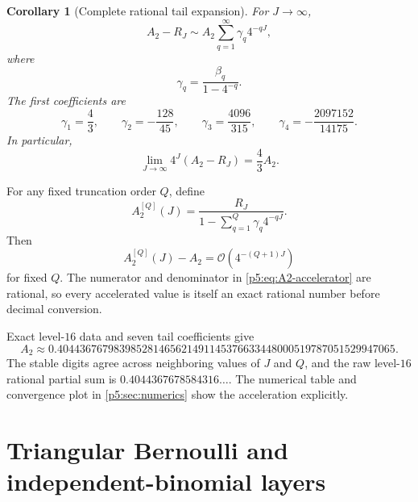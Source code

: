 \documentclass[11pt,oneside]{article}
\newtheorem{corollary}[theorem]{Corollary}
\theoremstyle{definition}
\newcommand{\bigO}{\mathcal O}
\begin{document}
\begin{corollary}[Complete rational tail expansion]
\label{p5:cor:A2-tail-asymptotic}
For $J\to\infty$,
\begin{equation}
 A_2-R_J\sim A_2\sum_{q=1}^\infty\gamma_q4^{-qJ},        \label{p5:eq:A2-tail-asymptotic}
\end{equation}
where
\begin{equation}
 \gamma_q=\frac{\beta_q}{1-4^{-q}}.                     \label{p5:eq:gamma-definition}
\end{equation}
The first coefficients are
\begin{equation}
 \gamma_1=\frac43,
 \qquad
 \gamma_2=-\frac{128}{45},
 \qquad
 \gamma_3=\frac{4096}{315},
 \qquad
 \gamma_4=-\frac{2097152}{14175}.                       \label{p5:eq:gamma-first}
\end{equation}
In particular,
\begin{equation}
 \boxed{\displaystyle
 \lim_{J\to\infty}4^J(A_2-R_J)=\frac43A_2.}             \label{p5:eq:A2-tail-leading}
\end{equation}
\end{corollary}

For any fixed truncation order $Q$, define
\begin{equation}
 A_2^{[Q]}(J)=
 \frac{R_J}{1-\sum_{q=1}^{Q}\gamma_q4^{-qJ}}.            \label{p5:eq:A2-accelerator}
\end{equation}
Then
\begin{equation}
 A_2^{[Q]}(J)-A_2=\bigO(4^{-(Q+1)J})                    \label{p5:eq:A2-accelerator-error}
\end{equation}
for fixed $Q$.  The numerator and denominator in
\eqref{p5:eq:A2-accelerator} are rational, so every accelerated value is itself
an exact rational number before decimal conversion.

\numerical Exact level-$16$ data and seven tail coefficients give
\begin{equation}
 A_2\approx
 0.404436767983985281465621491145376633448000519787051529947065. \label{p5:eq:A2-decimal}
\end{equation}
The stable digits agree across neighboring values of $J$ and $Q$, and the raw
level-$16$ rational partial sum is
$0.4044367678584316\ldots$.  The numerical table and convergence plot in
\cref{p5:sec:numerics} show the acceleration explicitly.

\section{Triangular Bernoulli and independent-binomial layers}
\label{p5:sec:triangular}
\end{document}
